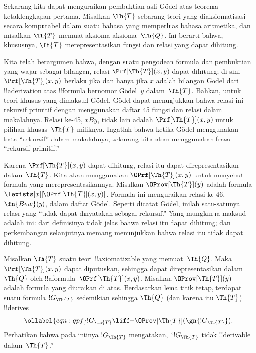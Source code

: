 \documentclass[../../../include/open-logic-section]{subfiles}
\begin{document}


Sekarang kita dapat menguraikan pembuktian asli G\"odel atas teorema
ketaklengkapan pertama. Misalkan $\Th{T}$ sebarang teori yang diaksiomatisasi
secara komputabel dalam suatu bahasa yang memperluas bahasa aritmetika, dan
misalkan $\Th{T}$ memuat aksioma-aksioma~$\Th{Q}$. Ini berarti bahwa,
khususnya, $\Th{T}$ merepresentasikan fungsi dan relasi yang dapat dihitung.

Kita telah berargumen bahwa, dengan suatu pengodean formula dan pembuktian
yang wajar sebagai bilangan, relasi $\Prf[\Th{T}](x,y)$ dapat dihitung; di
sini $\Prf[\Th{T}](x,y)$ berlaku jika dan hanya jika $x$ adalah bilangan
G\"odel dari !!a{derivation} atas !!{formula} bernomor G\"odel~$y$
dalam~$\Th{T}$. Bahkan, untuk teori khusus yang dimaksud G\"odel, G\"odel
dapat menunjukkan bahwa relasi ini rekursif primitif dengan menggunakan
daftar 45 fungsi dan relasi dalam makalahnya. Relasi ke-45, $x B y$, tidak
lain adalah $\Prf[\Th{T}](x,y)$ untuk pilihan khusus~$\Th{T}$ miliknya.
Ingatlah bahwa ketika G\"odel menggunakan kata ``rekursif'' dalam
makalahnya, sekarang kita akan menggunakan frasa ``rekursif primitif.''

Karena $\Prf[\Th{T}](x,y)$ dapat dihitung, relasi itu dapat direpresentasikan
dalam~$\Th{T}$. Kita akan menggunakan $\OPrf[\Th{T}](x,y)$ untuk menyebut
formula yang merepresentasikannya. Misalkan $\OProv[\Th{T}](y)$ adalah
formula $\lexists[x][\OPrf[\Th{T}](x,y)]$. Formula ini menguraikan relasi
ke-46, $\fn{Bew}(y)$, dalam daftar G\"odel. Seperti dicatat G\"odel, inilah
satu-satunya relasi yang ``tidak dapat dinyatakan sebagai rekursif.'' Yang
mungkin ia maksud adalah ini: dari definisinya tidak jelas bahwa relasi itu
dapat dihitung; dan perkembangan selanjutnya memang menunjukkan bahwa relasi
itu tidak dapat dihitung.

Misalkan $\Th{T}$ suatu teori !!{axiomatizable} yang memuat~$\Th{Q}$. Maka
$\Prf[\Th{T}](x, y)$ dapat diputuskan, sehingga dapat direpresentasikan
dalam~$\Th{Q}$ oleh !!a{formula}~$\OPrf[\Th{T}](x, y)$. Misalkan
$\OProv[\Th{T}](y)$ adalah formula yang diuraikan di atas. Berdasarkan lema
titik tetap, terdapat suatu formula $!G_\Th{T}$ sedemikian sehingga
$\Th{Q}$ (dan karena itu $\Th{T}$) !!{derive}s
\begin{equation}
\ollabel{eqn:qpf}
!G_\Th{T} \liff \lnot \OProv[\Th{T}](\gn{!G_\Th{T}}).
\end{equation}
Perhatikan bahwa pada intinya $!G_\Th{T}$ mengatakan,
``$!G_\Th{T}$ tidak !!{derivable} dalam~$\Th{T}$.''
\end{document}
